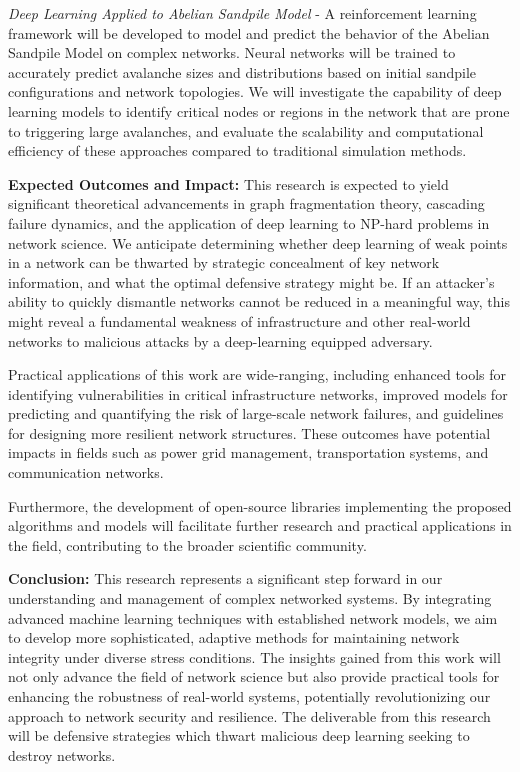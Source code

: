 \begin{outline-of-proposed-research}
\textit{Deep Learning Applied to Abelian Sandpile Model} - A reinforcement learning framework will be developed to model and predict the behavior of the Abelian Sandpile Model on complex networks. Neural networks will be trained to accurately predict avalanche sizes and distributions based on initial sandpile configurations and network topologies. We will investigate the capability of deep learning models to identify critical nodes or regions in the network that are prone to triggering large avalanches, and evaluate the scalability and computational efficiency of these approaches compared to traditional simulation methods.

\textbf{Expected Outcomes and Impact:} This research is expected to yield significant theoretical advancements in graph fragmentation theory, cascading failure dynamics, and the application of deep learning to NP-hard problems in network science. We anticipate determining whether deep learning of weak points in a network can be thwarted by strategic concealment of key network information, and what the optimal defensive strategy might be. If an attacker's ability to quickly dismantle networks cannot be reduced in a meaningful way, this might reveal a fundamental weakness of infrastructure and other real-world networks to malicious attacks by a deep-learning equipped adversary.

Practical applications of this work are wide-ranging, including enhanced tools for identifying vulnerabilities in critical infrastructure networks, improved models for predicting and quantifying the risk of large-scale network failures, and guidelines for designing more resilient network structures. These outcomes have potential impacts in fields such as power grid management, transportation systems, and communication networks.

Furthermore, the development of open-source libraries implementing the proposed algorithms and models will facilitate further research and practical applications in the field, contributing to the broader scientific community.

\textbf{Conclusion:} This research represents a significant step forward in our understanding and management of complex networked systems. By integrating advanced machine learning techniques with established network models, we aim to develop more sophisticated, adaptive methods for maintaining network integrity under diverse stress conditions. The insights gained from this work will not only advance the field of network science but also provide practical tools for enhancing the robustness of real-world systems, potentially revolutionizing our approach to network security and resilience. The deliverable from this research will be defensive strategies which thwart malicious deep learning seeking to destroy networks.
\end{outline-of-proposed-research}